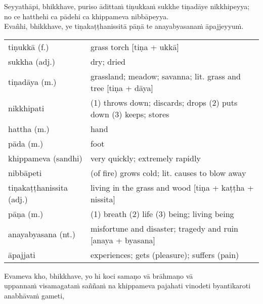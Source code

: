 \documentclass[11pt,oneside]{memoir}
\begin{document}
Seyyathāpi, bhikkhave, puriso ādittaṁ tiṇukkaṁ sukkhe tiṇadāye nikkhipeyya; \\[0pt]
no ce hatthehi ca pādehi ca khippameva nibbāpeyya. \\[0pt]
Evañhi, bhikkhave, ye tiṇakaṭṭhanissitā pāṇā te anayabyasanaṁ āpajjeyyuṁ.

\begin{longtable}{L{\colOne} L{\colTwo}}
tiṇukkā (f.) & grass torch [tiṇa + ukkā]\\[0pt]
sukkha (adj.) & dry; dried\\[0pt]
tiṇadāya (m.) & grassland; meadow; savanna; lit. grass and tree [tiṇa + dāya]\\[0pt]
nikkhipati & (1) throws down; discards; drops (2) puts down (3) keeps; stores\\[0pt]
hattha (m.) & hand\\[0pt]
pāda (m.) & foot\\[0pt]
khippameva (sandhi) & very quickly; extremely rapidly\\[0pt]
nibbāpeti & (of fire) grows cold; lit. causes to blow away\\[0pt]
tiṇakaṭṭhanissita (adj.) & living in the grass and wood [tiṇa + kaṭṭha + nissita]\\[0pt]
pāṇa (m.) & (1) breath (2) life (3) being; living being\\[0pt]
anayabyasana (nt.) & misfortune and disaster; tragedy and ruin [anaya + byasana]\\[0pt]
āpajjati & experiences; gets (pleasure); suffers (pain)\\[0pt]
\end{longtable}

Evameva kho, bhikkhave, yo hi koci samaṇo vā brāhmaṇo vā \\[0pt]
uppannaṁ visamagataṁ saññaṁ na khippameva pajahati vinodeti byantīkaroti anabhāvaṁ gameti,

\enlargethispage{\baselineskip}
\end{document}
